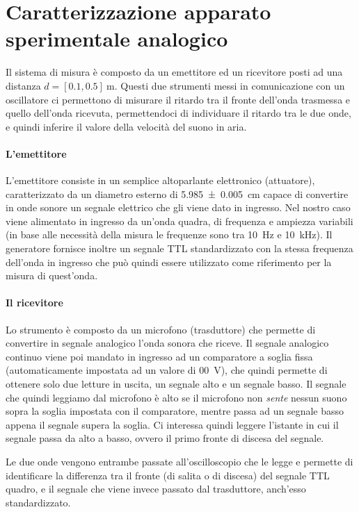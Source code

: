 \documentclass[
    rmp,
    reprint, 
    superscriptaddress, 
    altaffilletter, 
    amsmath, 
    amssymb, 
    a4paper, 
    fleqn]{revtex4-2}
\begin{document}
\section{Caratterizzazione apparato sperimentale analogico}

Il sistema di misura è composto da un emettitore ed un ricevitore posti ad una distanza $d=[0.1, 0.5]~\si{\metre}$. Questi due strumenti messi in comunicazione con un oscillatore ci permettono di misurare il ritardo tra il fronte dell'onda trasmessa e quello dell'onda ricevuta, permettendoci di individuare il ritardo tra le due onde, e quindi inferire il valore della velocità del suono in aria. 

\paragraph*{L'emettitore} L'emettitore consiste in un semplice altoparlante elettronico (attuatore), caratterizzato da un diametro esterno di \SI{5.985+-0.005}{\centi\metre} capace di convertire in onde sonore un segnale elettrico che gli viene dato in ingresso. Nel nostro caso viene alimentato in ingresso da un'onda quadra, di frequenza e ampiezza variabili (in base alle necessità della misura le frequenze sono tra \SI{10}{\hertz} e \SI{10}{\kilo\hertz}). Il generatore fornisce inoltre un segnale TTL standardizzato con la stessa frequenza dell'onda in ingresso che può quindi essere utilizzato come riferimento per la misura di quest'onda.

\paragraph*{Il ricevitore} Lo strumento è composto da un microfono (trasduttore) che permette di convertire in segnale analogico l'onda sonora che riceve. Il segnale analogico continuo viene poi mandato in ingresso ad un comparatore a soglia fissa (automaticamente impostata ad un valore di \SI{00}{\volt}), che quindi permette di ottenere solo due letture in uscita, un segnale alto e un segnale basso. Il segnale che quindi leggiamo dal microfono è alto se il microfono non \emph{sente} nessun suono sopra la soglia impostata con il comparatore, mentre passa ad un segnale basso appena il segnale supera la soglia. Ci interessa quindi leggere l'istante in cui il segnale passa da alto a basso, ovvero il primo fronte di discesa del segnale. 

Le due onde vengono entrambe passate all'oscilloscopio che le legge e permette di identificare la differenza tra il fronte (di salita o di discesa) del segnale TTL quadro, e il segnale che viene invece passato dal trasduttore, anch'esso standardizzato. 
\end{document}
